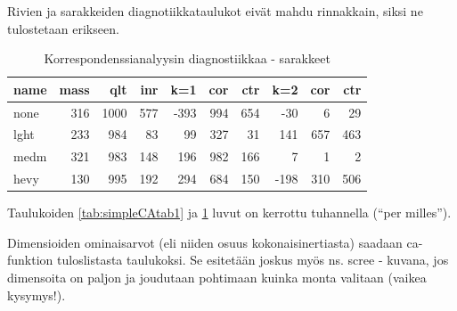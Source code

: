 \documentclass[finnish,]{book}
\newenvironment{Shaded}{\begin{snugshade}}{\end{snugshade}}
\newcommand{\DataTypeTok}[1]{\textcolor[rgb]{0.13,0.29,0.53}{#1}}
\newcommand{\DecValTok}[1]{\textcolor[rgb]{0.00,0.00,0.81}{#1}}
\newcommand{\KeywordTok}[1]{\textcolor[rgb]{0.13,0.29,0.53}{\textbf{#1}}}
\newcommand{\NormalTok}[1]{#1}
\newcommand{\OperatorTok}[1]{\textcolor[rgb]{0.81,0.36,0.00}{\textbf{#1}}}
\newcommand{\OtherTok}[1]{\textcolor[rgb]{0.56,0.35,0.01}{#1}}
\newcommand{\StringTok}[1]{\textcolor[rgb]{0.31,0.60,0.02}{#1}}
\theoremstyle{definition}
\theoremstyle{definition}
\theoremstyle{definition}
\theoremstyle{remark}
\begin{document}
Rivien ja sarakkeiden diagnotiikkataulukot eivät mahdu rinnakkain, siksi
ne tulostetaan erikseen.

\begin{Shaded}
\end{Shaded}

\begin{table}

\caption{\label{tab:simpleCAtab2}Korrespondenssianalyysin diagnostiikkaa - sarakkeet}
\centering
\begin{tabular}[t]{lrrrrrrrrr}
\toprule
name & mass &  qlt &  inr &  k=1 & cor & ctr &  k=2 & cor & ctr\\
\midrule
none & 316 & 1000 & 577 & -393 & 994 & 654 & -30 & 6 & 29\\
lght & 233 & 984 & 83 & 99 & 327 & 31 & 141 & 657 & 463\\
medm & 321 & 983 & 148 & 196 & 982 & 166 & 7 & 1 & 2\\
hevy & 130 & 995 & 192 & 294 & 684 & 150 & -198 & 310 & 506\\
\bottomrule
\end{tabular}
\end{table}

Taulukoiden \ref{tab:simpleCAtab1} ja \ref{tab:simpleCAtab2} luvut on
kerrottu tuhannella (``per milles'').

Dimensioiden ominaisarvot (eli niiden osuus kokonaisinertiasta) saadaan
ca-funktion tuloslistasta taulukoksi. Se esitetään joskus myös ns. scree
- kuvana, jos dimensoita on paljon ja joudutaan pohtimaan kuinka monta
valitaan (vaikea kysymys!).

\begin{Shaded}
\end{Shaded}
\end{document}
